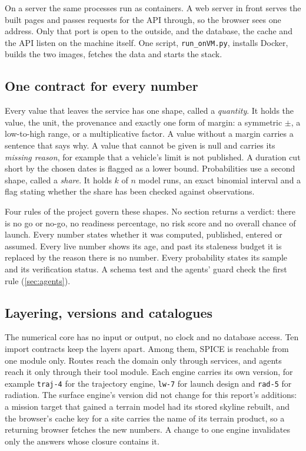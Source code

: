 \documentclass[11pt,a4paper]{article}
\begin{document}
On a server the same processes run as containers. A web server in front serves the built
pages and passes requests for the API through, so the browser sees one address. Only that
port is open to the outside, and the database, the cache and the API listen on the machine
itself. One script, \texttt{run\_onVM.py}, installs Docker, builds the two images, fetches the
data and starts the stack.

\subsection{One contract for every number}

Every value that leaves the service has one shape, called a \emph{quantity}. It holds the
value, the unit, the provenance and exactly one form of margin: a symmetric $\pm$, a
low-to-high range, or a multiplicative factor. A value without a margin carries a
sentence that says why. A value that cannot be given is null and carries its
\emph{missing reason}, for example that a vehicle's limit is not published. A duration
cut short by the chosen dates is flagged as a lower bound. Probabilities use a second shape, called a \emph{share}. It holds $k$ of $n$ model runs, an exact binomial interval \citep{clopper1934} and a flag stating whether the share has been checked against observations.

Four rules of the project govern these shapes. No section returns a verdict: there is no
go or no-go, no readiness percentage, no risk score and no overall chance of launch.
Every number states whether it was computed, published, entered or assumed. Every live
number shows its age, and past its staleness budget it is replaced by the reason there
is no number. Every probability states its sample and its verification status. A schema
test and the agents' guard check the first rule (\cref{sec:agents}).

\subsection{Layering, versions and catalogues}

The numerical core has no input or output, no clock and no database access. Ten import
contracts keep the layers apart. Among them, SPICE is reachable from one module only.
Routes reach the domain only through services, and agents reach it only through their
tool module. Each engine carries its own version, for example \texttt{traj-4} for the
trajectory engine, \texttt{lw-7} for launch design and \texttt{rad-5} for radiation. The
surface engine's version did not change for this report's additions: a mission target that
gained a terrain model had its stored skyline rebuilt, and the browser's cache key for a
site carries the name of its terrain product, so a returning browser fetches the new numbers. A change to one engine
invalidates only the answers whose closure contains it.
\end{document}
